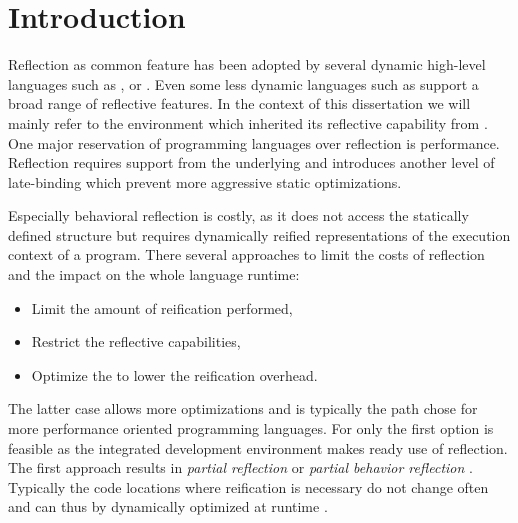 
\chapter{Introduction}
\minitoc

\noindent Reflection as common feature has been adopted by several dynamic high-level languages such as ,  or .
Even some less dynamic languages such as \Java support a broad range of reflective features.
In the context of this dissertation we will mainly refer to the \PH environment which inherited its reflective capability from \ST.
One major reservation of programming languages over reflection is performance.
Reflection requires support from the underlying \VM and introduces another level of late-binding which prevent more aggressive static optimizations.


Especially behavioral reflection is costly, as it does not access the statically defined structure but requires dynamically reified representations of the execution context of a program.
There several approaches to limit the costs of reflection and the impact on the whole language runtime:
\begin{itemize}[nolistsep]
	\item Limit the amount of reification performed,
	\item Restrict the reflective capabilities,
	\item Optimize the \VM to lower the reification overhead.
\end{itemize}
The latter case allows more optimizations and is typically the path chose for more performance oriented programming languages.
For \PH only the first option is feasible as the integrated development environment makes ready use of reflection.
The first approach results in \emph{partial reflection} or \emph{partial behavior reflection} \cite{Tant03a}.
Typically the code locations where reification is necessary do not change often and can thus by dynamically optimized at runtime \cite{Roet07b}.

